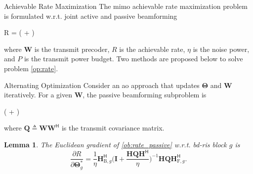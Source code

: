 \documentclass[journal]{IEEEtran}
\newtheorem{lemma}{Lemma}
\begin{document}
\begin{section}{Achievable Rate Maximization}\label{sc:rate}
	The \gls{mimo} achievable rate maximization problem is formulated w.r.t. joint active and passive beamforming
	\begin{maxi!}
		{}{R = \log \det \biggl( + \biggr)}{\label{op:rate}}{\label{ob:rate}}
	\end{maxi!}
	where $\mathbf{W}$ is the transmit precoder, $R$ is the achievable rate, $\eta$ is the noise power, and $P$ is the transmit power budget.
	Two methods are proposed below to solve problem \eqref{op:rate}.

	\begin{subsection}{Alternating Optimization}
		Consider an \gls{ao} approach that updates $\mathbf{\Theta}$ and $\mathbf{W}$ iteratively.
		For a given $\mathbf{W}$, the passive beamforming subproblem is
		\begin{maxi!}
			{\scriptstyle{\mathbf{\Theta}}}{\log \det \biggl( + \biggr)}{\label{op:rate_passive}}{\label{ob:rate_passive}}
			\addConstraint{\mathbf{\Theta}_g^\mathsf{H} \mathbf{\Theta}_g=\mathbf{I}, \quad \forall g,}{}{}
		\end{maxi!}
		where $\mathbf{Q} \triangleq \mathbf{W} \mathbf{W}^\mathsf{H}$ is the transmit covariance matrix.
		\begin{lemma}\label{lm:rate_gradient}
			The Euclidean gradient of \eqref{ob:rate_passive} w.r.t. \gls{bd}-\gls{ris} block $g$ is
			\begin{equation}
				\frac{\partial R}{\partial \mathbf{\Theta}_g^*} = \frac{1}{\eta} \mathbf{H}_{\mathrm{B},g}^\mathsf{H} \biggl(\mathbf{I} + \frac{\mathbf{H}\mathbf{Q}\mathbf{H}^\mathsf{H}}{\eta}\biggr)^{-1} \mathbf{H} \mathbf{Q} \mathbf{H}_{\mathrm{F},g}^\mathsf{H}.
				\label{eq:rate_gradient}
			\end{equation}
		\end{lemma}


\end{subsection}
\end{section}
\end{document}
